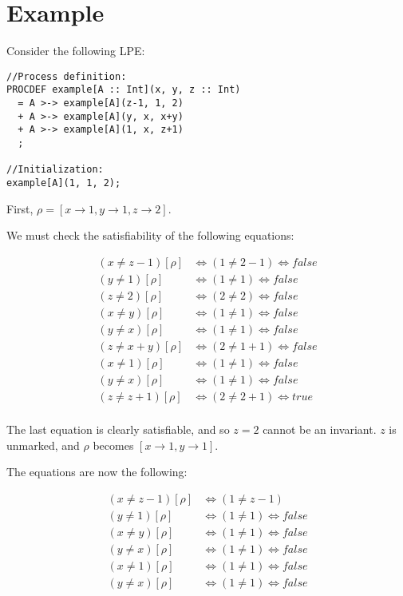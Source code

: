 \section{Example}

Consider the following LPE:

\begin{lstlisting}
//Process definition:
PROCDEF example[A :: Int](x, y, z :: Int)
  = A >-> example[A](z-1, 1, 2)
  + A >-> example[A](y, x, x+y)
  + A >-> example[A](1, x, z+1)
  ;

//Initialization:
example[A](1, 1, 2);
\end{lstlisting}

First, $\rho = [ x \rightarrow 1, y \rightarrow 1, z \rightarrow 2 ]$.

We must check the satisfiability of the following equations:

\begin{align*}
(x \neq z-1)[\rho] &\Leftrightarrow (1 \neq 2-1) \Leftrightarrow \textit{false} \\
(y \neq 1)[\rho] &\Leftrightarrow (1 \neq 1) \Leftrightarrow \textit{false} \\
(z \neq 2)[\rho] &\Leftrightarrow (2 \neq 2) \Leftrightarrow \textit{false} \\
(x \neq y)[\rho] &\Leftrightarrow (1 \neq 1) \Leftrightarrow \textit{false} \\
(y \neq x)[\rho] &\Leftrightarrow (1 \neq 1) \Leftrightarrow \textit{false} \\
(z \neq x+y)[\rho] &\Leftrightarrow (2 \neq 1+1) \Leftrightarrow \textit{false} \\
(x \neq 1)[\rho] &\Leftrightarrow (1 \neq 1) \Leftrightarrow \textit{false} \\
(y \neq x)[\rho] &\Leftrightarrow (1 \neq 1) \Leftrightarrow \textit{false} \\
(z \neq z+1)[\rho] &\Leftrightarrow (2 \neq 2+1) \Leftrightarrow \textit{true} \\
\end{align*}

The last equation is clearly satisfiable, and so $z=2$ cannot be an invariant.
$z$ is unmarked, and $\rho$ becomes $[ x \rightarrow 1, y \rightarrow 1 ]$.

\clearpage
The equations are now the following:

\begin{align*}
(x \neq z-1)[\rho] &\Leftrightarrow (1 \neq z-1) \\
(y \neq 1)[\rho] &\Leftrightarrow (1 \neq 1) \Leftrightarrow \textit{false} \\
(x \neq y)[\rho] &\Leftrightarrow (1 \neq 1) \Leftrightarrow \textit{false} \\
(y \neq x)[\rho] &\Leftrightarrow (1 \neq 1) \Leftrightarrow \textit{false} \\
(x \neq 1)[\rho] &\Leftrightarrow (1 \neq 1) \Leftrightarrow \textit{false} \\
(y \neq x)[\rho] &\Leftrightarrow (1 \neq 1) \Leftrightarrow \textit{false} \\
\end{align*}

